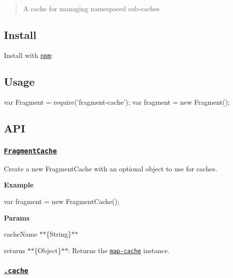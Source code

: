 \begin{quote}
A cache for managing namespaced sub-\/caches \end{quote}


\subsection*{Install}

Install with \href{https://www.npmjs.com/}{\tt npm}\+:




\subsection*{Usage}


\begin{DoxyCode}
var Fragment = require('fragment-cache');
var fragment = new Fragment();
\end{DoxyCode}


\subsection*{A\+PI}

\subsubsection*{\href{index.js#L24}{\tt Fragment\+Cache}}

Create a new {\ttfamily Fragment\+Cache} with an optional object to use for {\ttfamily caches}.

{\bfseries Example}


\begin{DoxyCode}
var fragment = new FragmentCache();
\end{DoxyCode}


{\bfseries Params}


\begin{DoxyItemize}
\item {\ttfamily cache\+Name} $\ast$$\ast$\{String\}$\ast$$\ast$
\item {\ttfamily returns} $\ast$$\ast$\{Object\}$\ast$$\ast$\+: Returns the \href{https://github.com/jonschlinkert/map-cache}{\tt map-\/cache} instance.
\end{DoxyItemize}

\subsubsection*{\href{index.js#L49}{\tt .cache}}

